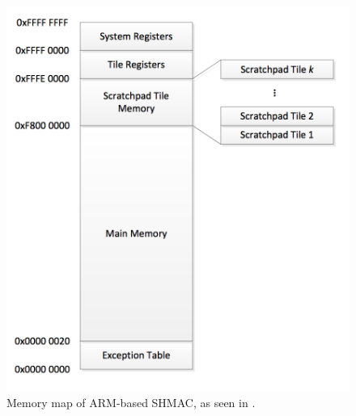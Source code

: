 %
%
%

\begin{figure}[htb]
    \centering
    \includegraphics[width=1.0\textwidth]{Figures/Heterogeneous/SHMACMemory}
    \caption{Memory map of ARM-based SHMAC, as seen in \cite{shmac-plan}.}
    \label{fig:shmac-memory}
\end{figure}




